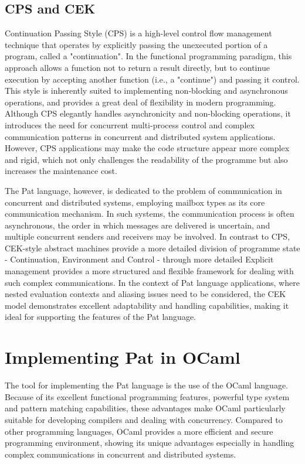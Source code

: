 \documentclass{l4proj}
\begin{document}
\subsection{CPS and CEK}
Continuation Passing Style (CPS) is a high-level control flow management technique that operates by explicitly passing the unexecuted portion of a program, called a "continuation". In the functional programming paradigm, this approach allows a function not to return a result directly, but to continue execution by accepting another function (i.e., a "continue") and passing it control. This style is inherently suited to implementing non-blocking and asynchronous operations, and provides a great deal of flexibility in modern programming. Although CPS elegantly handles asynchronicity and non-blocking operations, it introduces the need for concurrent multi-process control and complex communication patterns in concurrent and distributed system applications. However, CPS applications may make the code structure appear more complex and rigid, which not only challenges the readability of the programme but also increases the maintenance cost.

The Pat language, however, is dedicated to the problem of communication in concurrent and distributed systems, employing mailbox types as its core communication mechanism. In such systems, the communication process is often asynchronous, the order in which messages are delivered is uncertain, and multiple concurrent senders and receivers may be involved. In contrast to CPS, CEK-style abstract machines provide a more detailed division of programme state - Continuation, Environment and Control - through more detailed Explicit management provides a more structured and flexible framework for dealing with such complex communications. In the context of Pat language applications, where nested evaluation contexts and aliasing issues need to be considered, the CEK model demonstrates excellent adaptability and handling capabilities, making it ideal for supporting the features of the Pat language.

\section{Implementing Pat in OCaml}
The tool for implementing the Pat language is the use of the OCaml language. Because of its excellent functional programming features, powerful type system and pattern matching capabilities, these advantages make OCaml particularly suitable for developing compilers and dealing with concurrency. Compared to other programming languages, OCaml provides a more efficient and secure programming environment, showing its unique advantages especially in handling complex communications in concurrent and distributed systems.
\end{document}
